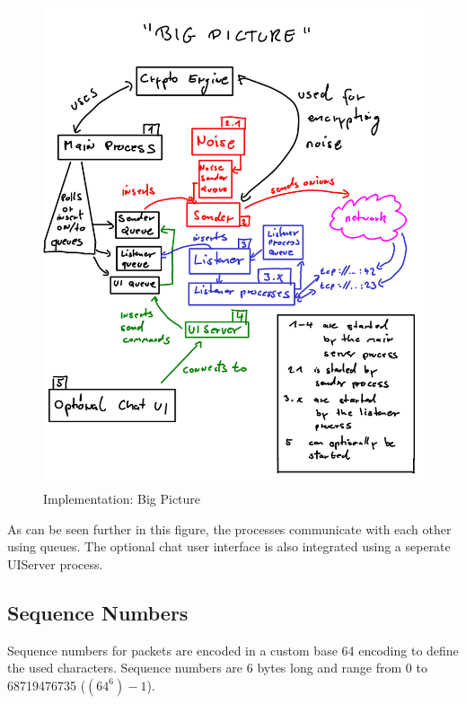 \begin{figure}[htb]
\caption{Implementation: Big Picture}
\label{bigpicture}
\includegraphics[scale=0.8]{bigpicture.png}
\end{figure}
As can be seen further in this figure, the processes communicate with
each other using queues. The optional chat user interface is also
integrated using a seperate UIServer process.
\subsection{Sequence Numbers}
Sequence numbers for packets are encoded in a custom base 64 encoding to
define the used characters. Sequence numbers are 6 bytes
long and range from 0 to 68719476735 ($(64^6)-1$).

